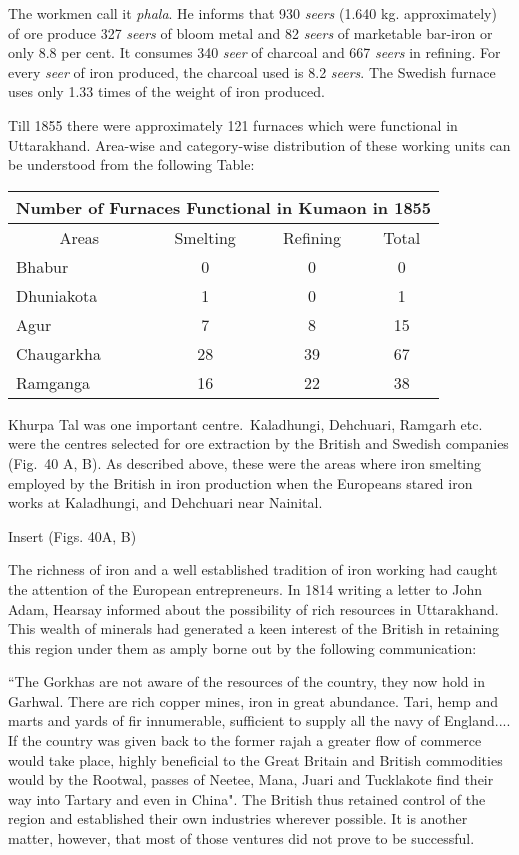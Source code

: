 The workmen call it {\it phala}. He informs that 930 {\it seers} (1.640 kg. approximately) of ore produce 327 {\it seers} of bloom metal and 82 {\it seers} of marketable bar-iron or only 8.8 per cent. It consumes 340 {\it seer} of charcoal and 667 {\it seers} in refining. For every {\it seer} of iron produced, the charcoal used is 8.2 {\it seers}. The Swedish furnace uses only 1.33 times of the weight of iron produced. 

Till 1855 there were approximately 121 furnaces which were functional in Uttarakhand. Area-wise and category-wise distribution of these working units can be understood from the following Table:

\vspace{-.3cm}

{\fontsize{8}{10}\selectfont\begin{longtable}{|l|c|c|c|}
\multicolumn{4}{c}{\textbf{Number of Furnaces Functional in Kumaon in 1855}}\\[2pt]
\hline 
\multicolumn{1}{|c|}{Areas} & Smelting & Refining & Total\\
\hline
Bhabur & 0 & 0 & 0\\
\hline
Dhuniakota & 1 & 0 &1\\
\hline
Agur & 7 & 8 &15\\
\hline
Chaugarkha & 28 & 39 & 67\\
\hline
Ramganga & 16 & 22 & 38\\
\hline
\end{longtable}}

Khurpa Tal was one important centre.~Kaladhungi, Dehchuari, Ramgarh etc. were the centres selected for ore extraction by the British and Swedish companies (Fig.~40 A, B). As described above, these were the areas where iron smelting employed by the British in iron production when the Europeans stared iron works at Kaladhungi, and Dehchuari near Nainital.

Insert (Figs. 40A, B)

The richness of iron and a well established tradition of iron working had caught the attention of the European entrepreneurs. In 1814 writing a letter to John Adam, Hearsay informed about the possibility of rich resources in Uttarakhand. This wealth of minerals had generated a keen interest of the British in retaining this region under them as amply borne out by the following communication:

\footnotesize{``The Gorkhas are not aware of the resources of the country, they now hold in Garhwal. There are rich copper mines, iron in great abundance. Tari, hemp and marts and yards of fir innumerable, sufficient to supply all the navy of England.... If the country was given back to the former rajah a greater flow of commerce would take place, highly beneficial to the Great Britain and British commodities would by the Rootwal, passes of Neetee, Mana, Juari and Tucklakote find their way into Tartary and even in China".} The British thus retained control of the region and established their own industries wherever possible. It is another matter, however, that most of those ventures did not prove to be successful.

